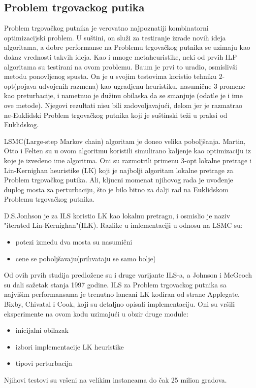 \documentclass[a4paper]{article}
\begin{document}
\subsection{Problem trgovackog putika}
Problem trgovačkog putnika je verovatno najpoznatiji kombinatorni optimizacijski problem. U suštini, on služi za testiranje izrade novih ideja algoritama, a dobre performanse na Problemu trgovačkog putnika se uzimaju kao dokaz vrednosti takvih ideja. Kao i mnoge metaheuristike, neki od prvih ILP algoritama su testirani na ovom problemu. 
Baum je prvi to uradio, osmislivši metodu ponovljenog spusta. On je u svojim testovima koristio tehniku 2-opt(pojava udvojenih razmena) kao ugradjenu heuristiku, nasumične 3-promene kao preturbacije, i nametnuo je dužinu obilaska da se smanjuje (odatle je i ime ove metode). Njegovi rezultati nisu bili zadovoljavajući, delom jer je razmatrao ne-Euklidski Problem trgovačkog putnika koji je suštinski teži u praksi od Euklidskog.

LSMC(Large-step Markov chain) algoritam je doneo velika poboljšanja. Martin, Otto i Felten su u ovom algoritmu koristili simulirano kaljenje kao optimizaciju iz koje je izvedeno ime algoritma. Oni su razmotrili primenu 3-opt lokalne pretrage i Lin-Kernighan heuristike (LK) koji je najbolji algoritam lokalne pretrage za Problem trgovačkog putika. Ali, kljucni momenat njihovog rada je uvođenje duplog mosta za perturbaciju, što je bilo bitno za dalji rad na Euklidskom Problemu trgovačkog putnika.

D.S.Jonhson je za ILS koristio LK kao lokalnu pretragu, i osmislio je naziv  "iterated Lin-Kernighan"(ILK). Razlike u imlementaciji u odnosu na LSMC su:
\begin{itemize}
  \item potezi između dva mosta su nasumični
  \item cene se poboljšavaju(prihvataju se samo bolje)
\end{itemize}
Od ovih prvih studija predložene su i druge varijante ILS-a, a Johnson i McGeoch su dali sažetak stanja 1997 godine. 
ILS za Problem trgovackog putnika sa najvišim performansama je trenutno lancani LK kodiran od strane Applegate, Bixby, Chivatal i Cook, koji su detaljno opisali implementaciju. Oni su vršili eksperimente na ovom kodu uzimajući u obzir druge module:
\begin{itemize}
  \item inicijalni obilazak
  \item izbori implementacije LK heuristike
  \item tipovi perturbacija
\end{itemize}
Njihovi testovi su vršeni na velikim instancama do čak 25 milion gradova.
\end{document}
